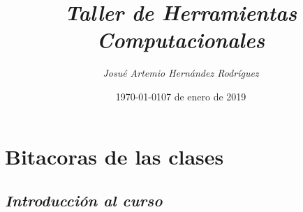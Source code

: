 \documentclass{book}
\title{\textit{Taller de Herramientas Computacionales}}
\author{\textit{Josué Artemio Hernández Rodríguez}}
\date{\today}
\begin{document}
\maketitle

\tableofcontents


	

\newpage

\chapter{Bitacoras de las clases}



\section{\textit{Introducción al curso}}%
\begin{flushright}
	\date{07 de enero de 2019}
\end{flushright}
\end{document}
